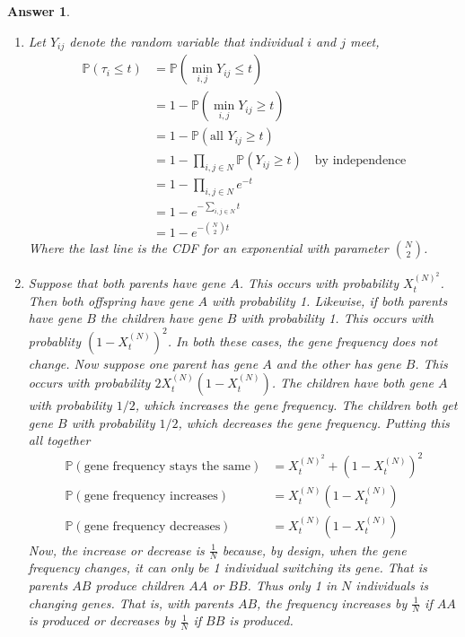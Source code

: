 \documentclass[12pt]{article}
\theoremstyle{colon}
\newtheorem*{answer}{Answer}
\begin{document}
\begin{answer}
  \leavevmode
  \begin{enumerate}[label=\alph*)]
    \item Let $Y_{ij}$ denote the random variable that individual $i$ and $j$ meet,
      \begin{align*}
        \mathbb{P}( \tau_i \leq t) &= \mathbb{P} ( \min_{i,j} Y_{ij} \leq t) \\
        &= 1 - \mathbb{P} ( \min_{i,j} Y_{ij} \geq t) \\
        &= 1 - \mathbb{P} ( \text{all } Y_{ij} \geq t) \\
        &= 1 - \prod_{i,j \in N} \mathbb{P} (Y_{ij} \geq t) \quad \text{by independence} \\
        &= 1 - \prod_{i,j \in N} e^{-t} \\
        &= 1 - e^{- \sum_{i,j \in N} t} \\
        &= 1 - e^{- \binom{N}{2} t}
      \end{align*}
      Where the last line is the CDF for an exponential with parameter $\binom{N}{2}$.

    \item Suppose that both parents have gene $A$. This occurs with probability $X_t^{(N)^2}$. Then both offspring have gene $A$ with probability 1. Likewise, if both parents have gene $B$ the children have gene $B$ with probability 1. This occurs with probablity $(1-X_t^{(N)})^2$. In both these cases, the gene frequency does not change. Now suppose one parent has gene $A$ and the other has gene $B$. This occurs with probability $2 X_t^{(N)} (1-X_t^{(N)})$. The children have both gene $A$ with probability $1/2$, which increases the gene frequency. The children both get gene $B$ with probability $1/2$, which decreases the gene frequency. Putting this all together
      \begin{align*}
        \mathbb{P}(\text{gene frequency stays the same}) &= X_t^{(N)^2} + (1-X_t^{(N)})^2 \\
        \mathbb{P}(\text{gene frequency increases}) &= X_t^{(N)} (1-X_t^{(N)}) \\
        \mathbb{P}(\text{gene frequency decreases}) &= X_t^{(N)} (1-X_t^{(N)})
      \end{align*}
      Now, the increase or decrease is $\frac{1}{N}$ because, by design, when the gene frequency changes, it can only be 1 individual switching its gene. That is parents $AB$ produce children $AA$ or $BB$. Thus only 1 in $N$ individuals is changing genes. That is, with parents $AB$, the frequency increases by $\frac{1}{N}$ if $AA$ is produced or decreases by $\frac{1}{N}$ if $BB$ is produced.


\end{enumerate}
\end{answer}
\end{document}
